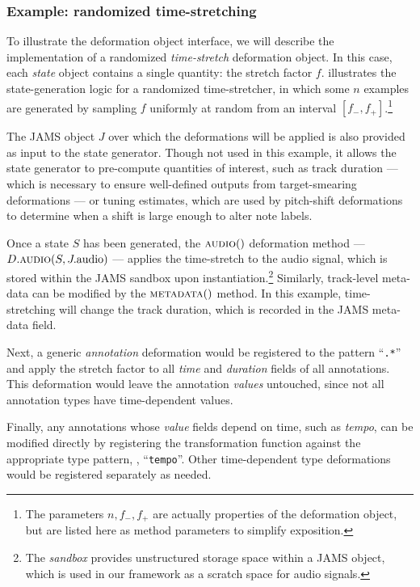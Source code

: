 \documentclass{article}
\begin{document}
\subsubsection{Example: randomized time-stretching}
To illustrate the deformation object interface, we will describe the implementation of a 
randomized \emph{time-stretch} deformation object.
In this case, each \emph{state} object contains a single quantity: the stretch factor $f$.
 illustrates the state-generation logic for a randomized
time-stretcher, in which some $n$ examples are generated by sampling $f$ uniformly at
random from an interval $[f_-, f_+]$.\footnote{The parameters $n, f_-, f_+$ are actually
    properties of the deformation object, but are listed here as method parameters to
simplify exposition.}

The JAMS object $J$ over which the deformations will be applied is also provided as input 
to the state generator.  Though not used in this example, it allows the state generator
to pre-compute quantities of interest, such as track duration 
 --- which is necessary to ensure well-defined outputs from target-smearing deformations --- 
or tuning estimates, which are used by pitch-shift deformations to 
determine when a shift is large enough to 
alter note labels.

Once a state $S$ has been generated, the $\Call{audio}$ deformation method
--- $D.\Call{audio}{S, J.\text{audio}}$ --- 
applies the time-stretch to the audio signal, which is stored within the
JAMS sandbox upon instantiation.\footnote{The \emph{sandbox} provides unstructured
storage space within a JAMS object, which is used in our framework as a scratch space for
audio signals.}  Similarly, track-level meta-data can be modified by the $\Call{metadata}$
method.  In this example, time-stretching will change the track duration, which is recorded
in the JAMS meta-data field.

Next, a generic \emph{annotation} deformation would be registered to the pattern
``\texttt{.*}'' and apply the stretch factor to all \emph{time} and \emph{duration}
fields of all annotations.  This deformation would leave the annotation
\emph{values} untouched, since not all annotation types have time-dependent values.

Finally, any annotations whose \emph{value} fields depend on time, such as \emph{tempo},
can be modified directly by registering the transformation function against the
appropriate type pattern, \eg, ``\texttt{tempo}''.  Other time-dependent type
deformations would be registered separately as needed.
\end{document}
